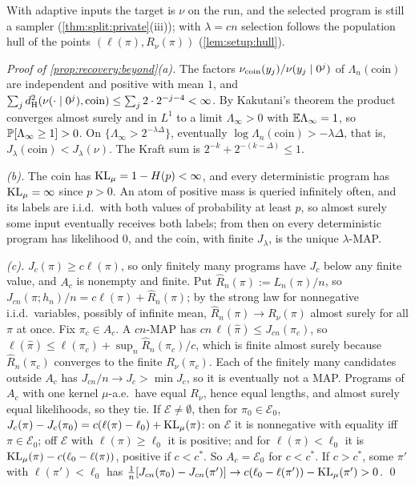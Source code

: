 With adaptive inputs the target is $\nu$ on the run, and the selected program is still a sampler (\cref{thm:split:private}(iii)); with $\lambda=cn$ selection follows the population hull of the points $(\ell(\pi),R_\nu(\pi))$ (\cref{lem:setup:hull}).

\emph{Proof of \cref{prop:recovery:beyond}(a).} The factors $\nu_{\rm coin}(y_j)/\nu(y_j\mid0^j)$ of $\Lambda_n(\text{coin})$ are independent and positive with mean $1$, and $\sum_jd_{\mathrm{H}}^{2}(\nu(\cdot\mid0^j),\text{coin})\le\sum_j2\cdot2^{-j-4}<\infty$. By Kakutani's theorem \citep{kakutani1948equivalence} the product converges almost surely and in $L^1$ to a limit $\Lambda_\infty>0$ with $\mathbb{E}\Lambda_\infty=1$, so $\mathbb{P}[\Lambda_\infty\ge1]>0$. On $\{\Lambda_\infty>2^{-\lambda\Delta}\}$, eventually $\log\Lambda_n(\text{coin})>-\lambda\Delta$, that is, $J_\lambda(\text{coin})<J_\lambda(\nu)$. The Kraft sum is $2^{-k}+2^{-(k-\Delta)}\le1$.

\emph{(b).} The coin has $\operatorname{KL}_\mu=1-H(p)<\infty$, and every deterministic program has $\operatorname{KL}_\mu=\infty$ since $p>0$. An atom of positive mass is queried infinitely often, and its labels are i.i.d.\ with both values of probability at least $p$, so almost surely some input eventually receives both labels; from then on every deterministic program has likelihood $0$, and the coin, with finite $J_\lambda$, is the unique $\lambda$-MAP.

\emph{(c).} $J_c(\pi)\ge c\ell(\pi)$, so only finitely many programs have $J_c$ below any finite value, and $A_c$ is nonempty and finite. Put $\hat R_n(\pi):=L_n(\pi)/n$, so $J_{cn}(\pi;h_n)/n=c\ell(\pi)+\hat R_n(\pi)$; by the strong law for nonnegative i.i.d.\ variables, possibly of infinite mean, $\hat R_n(\pi)\to R_\nu(\pi)$ almost surely for all $\pi$ at once. Fix $\pi_c\in A_c$. A $cn$-MAP has $cn\,\ell(\hat\pi)\le J_{cn}(\pi_c)$, so $\ell(\hat\pi)\le\ell(\pi_c)+\sup_n\hat R_n(\pi_c)/c$, which is finite almost surely because $\hat R_n(\pi_c)$ converges to the finite $R_\nu(\pi_c)$. Each of the finitely many candidates outside $A_c$ has $J_{cn}/n\to J_c>\min J_c$, so it is eventually not a MAP. Programs of $A_c$ with one kernel $\mu$-a.e.\ have equal $R_\nu$, hence equal lengths, and almost surely equal likelihoods, so they tie. If $\mathcal E\ne\emptyset$, then for $\pi_0\in\mathcal E_0$, $J_c(\pi)-J_c(\pi_0)=c(\ell(\pi)-\ell_0)+\operatorname{KL}_\mu(\pi)$: on $\mathcal E$ it is nonnegative with equality iff $\pi\in\mathcal E_0$; off $\mathcal E$ with $\ell(\pi)\ge\ell_0$ it is positive; and for $\ell(\pi)<\ell_0$ it is $\operatorname{KL}_\mu(\pi)-c(\ell_0-\ell(\pi))$, positive if $c<c^*$. So $A_c=\mathcal E_0$ for $c<c^*$. If $c>c^*$, some $\pi'$ with $\ell(\pi')<\ell_0$ has $\frac1n[J_{cn}(\pi_0)-J_{cn}(\pi')]\to c(\ell_0-\ell(\pi'))-\operatorname{KL}_\mu(\pi')>0$. \qed
